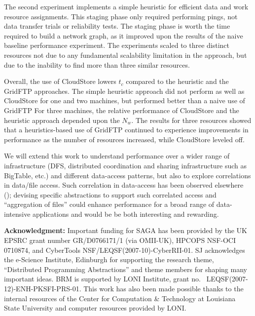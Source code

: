 \documentclass{rspublic}
\begin{document}
The second experiment implements a simple heuristic for efficient data
and work resource assignments. This staging phase only required
performing pings, not data transfer trials or reliability tests. The
staging phase is worth the time required to build a network graph, as
it improved upon the results of the naive baseline performance
experiment. The experiments scaled to three distinct resources not due
to any fundamental scalability limitation in the approach, but due to
the inability to find more than three similar resources.
 
Overall, the use of CloudStore lowers $t_c$ compared to the
heuristic and the GridFTP approaches. The simple heuristic 
approach did not perform as well as CloudStore for one and two
machines, but performed better than a naive use of GridFTP For three
machines, the relative performance of CloudStore and the heuristic
approach depended upon the $N_w$. The results for three resources
showed that a heuristics-based use of GridFTP continued to experience
improvements in performance as the number of resources increased, while
CloudStore leveled off. 

We will extend this work to understand performance over a wider range
of infrastructure (DFS, distributed coordination and sharing
infrastructure such as BigTable, etc.) and different data-access
patterns, but also to explore correlations in data/file access. Such
correlation in data-access has been observed elsewhere
(\cite{filecule}); devising specific abstractions to support such
correlated access and ``aggregation of files'' could enhance
performance for a broad range of data-intensive applications and would
be be both interesting and rewarding.

{\bf Acknowledgment:} Important funding for SAGA has been provided by
the UK EPSRC grant number GR/D0766171/1 (via OMII-UK), HPCOPS
NSF-OCI 0710874, and CyberTools NSF/LEQSF(2007-10)-CyberRII-01.
 SJ acknowledges the e-Science Institute, Edinburgh
for supporting the research theme, ``Distributed Programming
Abstractions'' and theme members for shaping many important ideas. BRM
is supported by LONI Institute, grant no. \
LEQSF(2007-12)-ENH-PKSFI-PRS-01. This work has also been made possible
thanks to the internal resources of the Center for Computation \&
Technology at Louisiana State University and computer resources
provided by LONI.

\vspace{-0.4cm}


%
 

\end{document}
